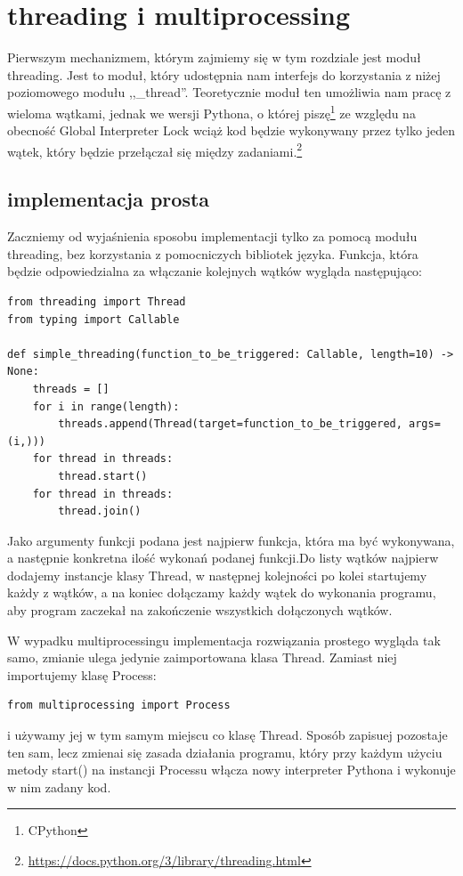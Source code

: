 \section{threading i multiprocessing}
Pierwszym mechanizmem, którym zajmiemy się w tym rozdziale jest moduł threading. Jest to moduł, który udostępnia nam interfejs do korzystania z niżej poziomowego modułu ,,\_thread''. Teoretycznie moduł ten umożliwia nam pracę z wieloma wątkami, jednak we wersji Pythona, o której piszę\footnote{CPython} ze względu na obecność Global Interpreter Lock wciąż kod będzie wykonywany przez tylko jeden wątek, który będzie przełączał się między zadaniami.\footnote{\url{https://docs.python.org/3/library/threading.html}}
\subsection{implementacja prosta}
Zaczniemy od wyjaśnienia sposobu implementacji tylko za pomocą modułu threading, bez korzystania z pomocniczych bibliotek języka. Funkcja, która będzie odpowiedzialna za włączanie kolejnych wątków wygląda następująco:
\begin{lstlisting}
from threading import Thread
from typing import Callable

def simple_threading(function_to_be_triggered: Callable, length=10) -> None:
    threads = []
    for i in range(length):
        threads.append(Thread(target=function_to_be_triggered, args=(i,)))
    for thread in threads:
        thread.start()
    for thread in threads:
        thread.join()
\end{lstlisting}
Jako argumenty funkcji podana jest najpierw funkcja, która ma być wykonywana, a następnie konkretna ilość wykonań podanej funkcji.Do listy wątków najpierw dodajemy instancje klasy Thread, w następnej kolejności po kolei startujemy każdy z wątków, a na koniec dołączamy każdy wątek do wykonania programu, aby program zaczekał na zakończenie wszystkich dołączonych wątków.

W wypadku multiprocessingu implementacja rozwiązania prostego wygląda tak samo, zmianie ulega jedynie zaimportowana klasa Thread. Zamiast niej importujemy klasę Process:
\begin{lstlisting}
from multiprocessing import Process
\end{lstlisting}
i używamy jej w tym samym miejscu co klasę Thread. Sposób zapisuej pozostaje ten sam, lecz zmienai się zasada działania programu, który przy każdym użyciu metody start() na instancji Processu włącza nowy interpreter Pythona i wykonuje w nim zadany kod.

